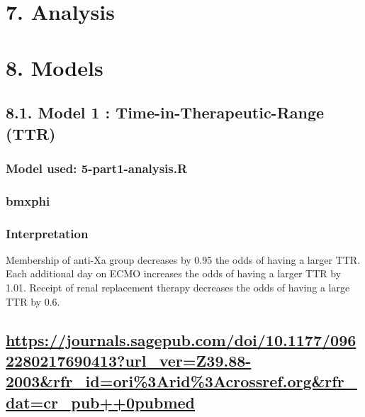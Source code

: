 \documentclass[
]{article}
\begin{document}
\hypertarget{analysis}{%
\section{7. Analysis}\label{analysis}}

\hypertarget{models}{%
\section{8. Models}\label{models}}

\hypertarget{model-1-time-in-therapeutic-range-ttr}{%
\subsection{8.1. Model 1 : Time-in-Therapeutic-Range
(TTR)}\label{model-1-time-in-therapeutic-range-ttr}}

\hypertarget{model-used-5-part1-analysis.r}{%
\subsubsection{Model used:
5-part1-analysis.R}\label{model-used-5-part1-analysis.r}}

\hypertarget{bmxphi}{%
\subsubsection{bmxphi}\label{bmxphi}}

\hypertarget{interpretation}{%
\subsubsection{Interpretation}\label{interpretation}}

Membership of anti-Xa group decreases by 0.95 the odds of having a
larger TTR. Each additional day on ECMO increases the odds of having a
larger TTR by 1.01. Receipt of renal replacement therapy decreases the
odds of having a large TTR by 0.6.

\hypertarget{httpsjournals.sagepub.comdoi10.11770962280217690413url_verz39.88-2003rfr_idori3arid3acrossref.orgrfr_datcr_pub0pubmed}{%
\subsection{\texorpdfstring{\url{https://journals.sagepub.com/doi/10.1177/0962280217690413?url_ver=Z39.88-2003\&rfr_id=ori\%3Arid\%3Acrossref.org\&rfr_dat=cr_pub++0pubmed}}{https://journals.sagepub.com/doi/10.1177/0962280217690413?url\_ver=Z39.88-2003\&rfr\_id=ori\%3Arid\%3Acrossref.org\&rfr\_dat=cr\_pub++0pubmed}}\label{httpsjournals.sagepub.comdoi10.11770962280217690413url_verz39.88-2003rfr_idori3arid3acrossref.orgrfr_datcr_pub0pubmed}}
\end{document}
